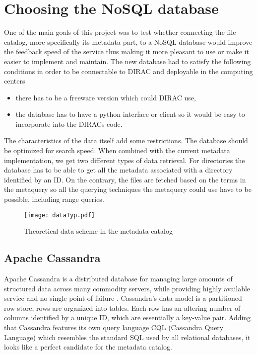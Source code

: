 \chapter{Choosing the NoSQL database}
\label{chap:databases}
One of the main goals of this project was to test whether connecting the 
file catalog, more specifically its metadata part, to a NoSQL database would 
improve the feedback speed of the service thus making it more pleasant to use
or make it easier to implement and maintain. The new database had to satisfy the
following conditions in order to be connectable to DIRAC and deployable in
the computing centers

\begin{itemize}
\item there has to be a freeware version which could DIRAC use,
\item the database has to have a python interface or client so it would be easy
to incorporate into the DIRACs code.
\end{itemize}

The characteristics of the data itself add some restrictions. The database should be
optimized for search speed. When combined with the current metadata implementation, we
get two different types of data retrieval. For directories 
the database has to be able to get all the metadata associated with a directory
identified by an ID. On the contrary, the files are fetched based on the terms in the metaquery so
all the querying techniques the metaquery could use have to be possible, including
range queries. 

\begin{figure}[h]
\centering
\texttt{[image: dataTyp.pdf]}
\label{fig:theoDataScheme}
\caption{Theoretical data scheme in the metadata catalog}
\end{figure}


\section{Apache Cassandra}
Apache Cassandra is a distributed database for managing large amounts of structured data 
across many commodity servers, while providing highly available service and no single point 
of failure \cite{cassandra}. Cassandra's data model is a
partitioned row store, rows are organized into tables. Each row
has an altering number of columns identified by a unique ID, which are essentially a
key-value pair. Adding that Cassandra features
its own query language CQL (Cassandra Query Language) which resembles the standard SQL 
used by all relational databases, it looks like a perfect candidate for the metadata catalog.

